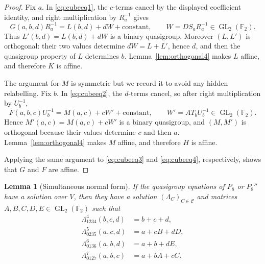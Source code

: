 \documentclass[preprint,12pt]{elsarticle}
\newtheorem{lemma}[theorem]{Lemma}
\theoremstyle{definition}
\newcommand{\F}{\mathbb F}
\newcommand{\GL}{\operatorname{GL}}
\begin{document}
\begin{proof}
Fix $a$. In \eqref{eq:cubeeq1}, the $c$-terms cancel by the displayed coefficient identity, and right multiplication by $R_a^{-1}$ gives
\[
G(a,b,d)R_a^{-1}=L(b,d)+dW+\text{constant},
\qquad W=DS_aR_a^{-1}\in\GL_2(\F_2).
\]
Thus $L'(b,d)=L(b,d)+dW$ is a binary quasigroup. Moreover $(L,L')$ is orthogonal: their two values determine $dW=L+L'$, hence $d$, and then the quasigroup property of $L$ determines $b$. Lemma~\ref{lem:orthogonal4} makes $L$ affine, and therefore $K$ is affine.

The argument for $M$ is symmetric but we record it to avoid any hidden relabelling. Fix $b$. In \eqref{eq:cubeeq2}, the $d$-terms cancel, so after right multiplication by $U_b^{-1}$,
\[
F(a,b,c)U_b^{-1}=M(a,c)+cW'+\text{constant},
\qquad W'=AT_bU_b^{-1}\in\GL_2(\F_2).
\]
Hence $M'(a,c)=M(a,c)+cW'$ is a binary quasigroup, and $(M,M')$ is orthogonal because their values determine $c$ and then $a$. Lemma~\ref{lem:orthogonal4} makes $M$ affine, and therefore $H$ is affine.

Applying the same argument to \eqref{eq:cubeeq3} and
\eqref{eq:cubeeq4}, respectively, shows that $G$ and $F$ are affine.
\end{proof}

\begin{lemma}[Simultaneous normal form]\label{lem:p8-normal}
If the quasigroup equations of $P_8$ or $P_8''$ have a solution over $V$,
then they have a solution $(\Lambda_C)_{C\in\mathcal C}$ and matrices
$A,B,C,D,E\in\GL_2(\F_2)$ such that
\begin{align}
\Lambda_{1234}^{4}(b,c,d)&=b+c+d,\label{eq:p8normal1}\\
\Lambda_{0235}^{5}(a,c,d)&=a+cB+dD,\label{eq:p8normal2}\\
\Lambda_{0136}^{6}(a,b,d)&=a+b+dE,\label{eq:p8normal3}\\
\Lambda_{0127}^{7}(a,b,c)&=a+bA+cC.\label{eq:p8normal4}
\end{align}
\end{lemma}
\end{document}
